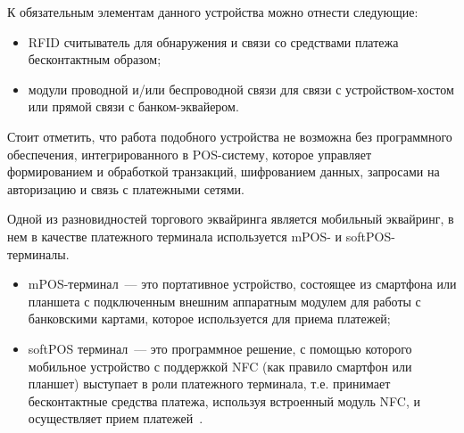 К обязательным элементам данного устройства можно отнести следующие:

\begin{itemize}
    \item RFID считыватель для обнаружения и связи со средствами платежа бесконтактным образом;
    \item модули проводной и/или беспроводной связи для связи с устройством-хостом или прямой связи с банком-эквайером.
\end{itemize}

Стоит отметить, что работа подобного устройства не возможна без программного обеспечения, интегрированного в POS-систему, которое управляет формированием и обработкой транзакций, шифрованием данных, запросами на авторизацию и связь с платежными сетями.

Одной из разновидностей торгового эквайринга является мобильный эквайринг, в нем в качестве платежного терминала используется mPOS- и softPOS-терминалы.

\begin{itemize}
    \item mPOS-терминал~--- это портативное устройство, состоящее из смартфона или планшета с подключенным внешним аппаратным модулем для работы с банковскими картами, которое используется для приема платежей;
    \item softPOS терминал~--- это программное решение, с помощью которого мобильное устройство с поддержкой NFC (как правило смартфон или планшет) выступает в роли платежного терминала, т.е. принимает бесконтактные средства платежа, используя встроенный модуль NFC, и осуществляет прием платежей~\cite{pos_term}.
\end{itemize}

